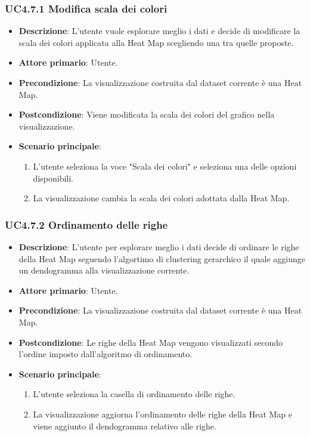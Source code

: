\subsubsection{UC4.7.1 Modifica scala dei colori}
\label{ssub:uc4.7.1}
\begin{itemize}
    \item \textbf{Descrizione}: L’utente vuole esplorare meglio i dati e decide di 
                                modificare la scala dei colori applicata alla Heat Map scegliendo una 
                                tra quelle proposte.
	
    \item \textbf{Attore primario}: Utente.
    
    \item \textbf{Precondizione}:   La visualizzazione costruita dal dataset corrente è una Heat Map.
    \item \textbf{Postcondizione}:  Viene modificata la scala dei colori del grafico nella visualizzazione.

	\item \textbf{Scenario principale}:
        \begin{enumerate}
            \item L'utente seleziona la voce "Scala dei colori" e seleziona una delle opzioni disponibili.
            \item La visualizzazione cambia la scala dei colori adottata dalla Heat Map.
        \end{enumerate}
\end{itemize}

\subsubsection{UC4.7.2 Ordinamento delle righe}
\label{ssub:uc4.7.2}
\begin{itemize}
    \item \textbf{Descrizione}: L’utente per esplorare meglio i dati decide di ordinare le righe della Heat Map
                                seguendo l'algortimo di clustering gerarchico il quale aggiunge un dendogramma alla visualizzazione corrente.
	
    \item \textbf{Attore primario}: Utente.
    
    \item \textbf{Precondizione}:   La visualizzazione costruita dal dataset corrente è una Heat Map.
    \item \textbf{Postcondizione}:  Le righe della Heat Map vengono visualizzati secondo l'ordine imposto dall'algoritmo di ordinamento.

	\item \textbf{Scenario principale}:
        \begin{enumerate}
            \item   L'utente seleziona la casella di ordinamento delle righe.
            \item   La visualizzazione aggiorna l'ordinamento delle righe della Heat Map e viene aggiunto 
                    il dendogramma relativo alle righe.
        \end{enumerate}
\end{itemize}


